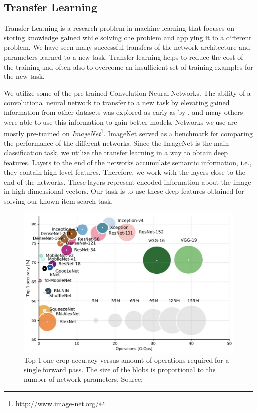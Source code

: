 
\subsection{Transfer Learning}

Transfer Learning is a research problem in machine learning that focuses on storing knowledge gained while solving one problem and applying it to a different problem. We have seen many successful transfers of the network architecture and parameters learned to a new task. Transfer learning helps to reduce the cost of the training and often also to overcome an insufficient set of training examples for the new task.

We utilize some of the pre-trained Convolution Neural Networks. The ability of a convolutional neural network to transfer to a new task by elevating gained information from other datasets was explored as early as by \cite{donahuedeep}, and many others were able to use this information to gain better models.  Networks we use are mostly pre-trained on \emph{ImageNet}\footnote{http://www.image-net.org/}. ImageNet served as a benchmark for comparing the performance of the different networks. Since the ImageNet is the main classification task, we utilize the transfer learning in a way to obtain deep features. Layers to the end of the networks accumulate semantic information, i.e., they contain high-level features. Therefore, we work with the layers close to the end of the networks. These layers represent encoded information about the image in high dimensional vectors. Our task is to use these deep features obtained for solving our known-item search task.

\begin{figure}
    \centering
	\includegraphics[width=0.8\linewidth]{img/network-comparison.jpeg}
	\caption{Top-1 one-crop accuracy versus amount of operations required for a single forward pass. The size of the blobs is proportional to the number of network parameters. Source: \cite{canziani2016analysis}}
	\label{fig:camera-setup}
\end{figure}

